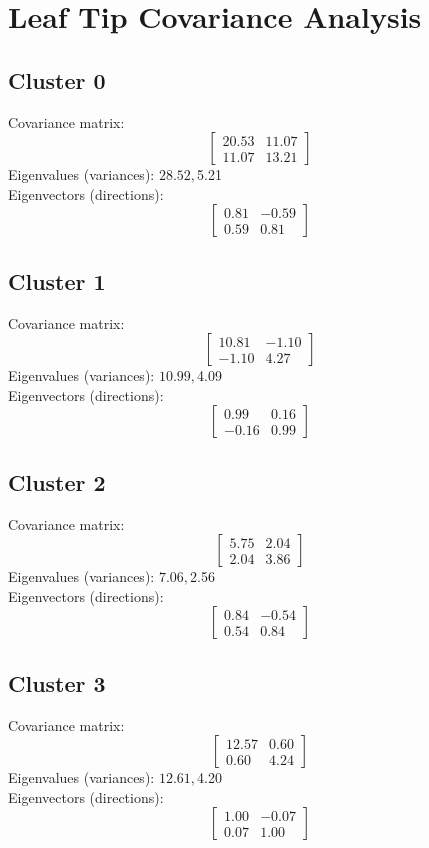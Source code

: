 \documentclass{article}
\begin{document}
\section*{Leaf Tip Covariance Analysis}
\subsection*{Cluster 0}
Covariance matrix:
\[\begin{bmatrix}20.53 & 11.07 \\11.07 & 13.21\end{bmatrix}\]
Eigenvalues (variances): $ 28.52, $5.21\\
Eigenvectors (directions):
\[\begin{bmatrix}0.81 & -0.59 \\0.59 & 0.81\end{bmatrix}\]
\subsection*{Cluster 1}
Covariance matrix:
\[\begin{bmatrix}10.81 & -1.10 \\-1.10 & 4.27\end{bmatrix}\]
Eigenvalues (variances): $ 10.99, $4.09\\
Eigenvectors (directions):
\[\begin{bmatrix}0.99 & 0.16 \\-0.16 & 0.99\end{bmatrix}\]
\subsection*{Cluster 2}
Covariance matrix:
\[\begin{bmatrix}5.75 & 2.04 \\2.04 & 3.86\end{bmatrix}\]
Eigenvalues (variances): $ 7.06, $2.56\\
Eigenvectors (directions):
\[\begin{bmatrix}0.84 & -0.54 \\0.54 & 0.84\end{bmatrix}\]
\subsection*{Cluster 3}
Covariance matrix:
\[\begin{bmatrix}12.57 & 0.60 \\0.60 & 4.24\end{bmatrix}\]
Eigenvalues (variances): $ 12.61, $4.20\\
Eigenvectors (directions):
\[\begin{bmatrix}1.00 & -0.07 \\0.07 & 1.00\end{bmatrix}\]
\end{document}
